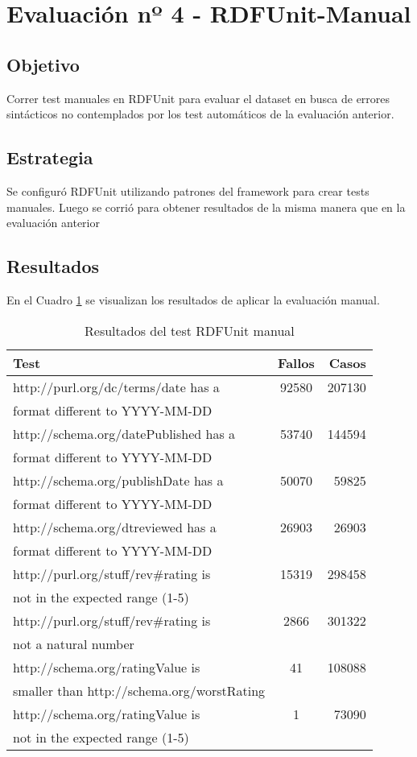 \section{Evaluación nº 4 - RDFUnit-Manual}
\label{section:evaluacion-manual}

\subsection*{Objetivo} Correr test manuales en RDFUnit para evaluar el dataset en busca de errores sintácticos no contemplados por los test
automáticos de la evaluación anterior.

\subsection*{Estrategia} Se configuró RDFUnit utilizando patrones del framework para crear tests manuales. Luego se corrió para obtener resultados
de la misma manera que en la evaluación anterior

\subsection*{Resultados}

En el Cuadro \ref{table:RDFUnitManual} se visualizan los resultados de aplicar la evaluación manual.
\begin{table}[h]
\begin{tabular}{| l | c | r | }\hline
Test & Fallos & Casos \\\hline
http://purl.org/dc/terms/date has a & 92580 & 207130\\ format different to YYYY-MM-DD & & \\\hline
http://schema.org/datePublished has a & 53740 & 144594\\ format different to YYYY-MM-DD   & & \\\hline
http://schema.org/publishDate has a & 50070 & 59825\\ format different to YYYY-MM-DD  & & \\\hline
http://schema.org/dtreviewed has a & 26903 & 26903\\ format different to YYYY-MM-DD & & \\\hline
http://purl.org/stuff/rev\#rating is & 15319 & 298458\\ not in the expected range (1-5) & & \\\hline
http://purl.org/stuff/rev\#rating is & 2866 & 301322\\ not a natural number & & \\\hline
http://schema.org/ratingValue is & 41 & 108088 \\ smaller than http://schema.org/worstRating & & \\\hline
http://schema.org/ratingValue is & 1 & 73090 \\ not in the expected range (1-5) & & \\\hline
\end{tabular}
\caption{Resultados del test RDFUnit manual}
\label{table:RDFUnitManual}
\end{table}

